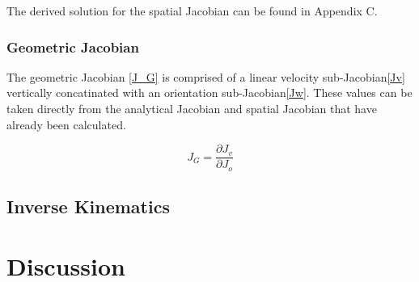 \documentclass[10pt,journal]{IEEEtran}
\begin{document}
The derived solution for the spatial Jacobian can be found in Appendix C.

\subsubsection{Geometric Jacobian}
The geometric Jacobian \ref{J_G} is comprised of a linear velocity sub-Jacobian\ref{Jv} vertically concatinated with an orientation sub-Jacobian\ref{Jw}. These values can be taken directly from the analytical Jacobian and spatial Jacobian that have already been calculated.

\begin{equation}\label{J_G}
	J_G = \frac{\partial J_v}{\partial J_o}
\end{equation}

\subsection{Inverse Kinematics}

\section{Discussion}

 
 
\end{document}
